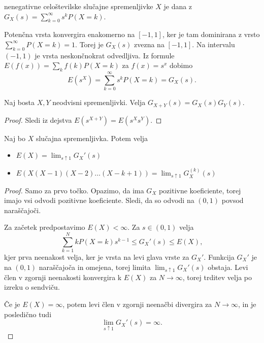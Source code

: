 
\begin{definicija}
   nenegativne celoštevilske slučajne spremenljivke $X$
  je dana z $G_X(s) = \sum_{k=0}^\infty s^k P(X=k)$.
\end{definicija}

Potenčna vrsta konvergira enakomerno na $[-1, 1]$, ker je tam dominirana z vrsto
$\sum_{k=0}^\infty P(X=k) = 1$.
Torej je $G_X(s)$ zvezna na $[-1, 1]$.
Na intervalu $(-1, 1)$ je vrsta neskončnokrat odvedljiva.
Iz formule $E(f(x)) = \sum_k f(k) P(X=k)$ za $f(x) = s^x$ dobimo
\[
  E(s^X) = \sum_{k=0}^\infty s^k P(X=k) = G_X(s).
\]

\begin{izrek}
  Naj bosta $X, Y$ neodvisni spremenljivki.
  Velja $G_{X+Y}(s) = G_X(s) G_Y(s)$.
\end{izrek}

\begin{proof}
  Sledi iz dejstva $E(s^{X+Y}) = E(s^X s^Y)$.
\end{proof}


\begin{izrek}
  Naj bo $X$ slučajna spremenljivka. Potem velja
  \begin{itemize}
  \item $E(X) = \lim_{s \uparrow 1} G_X'(s)$
  \item $E(X (X-1) (X-2) \ldots (X-k+1)) = \lim_{s \uparrow 1} G_X^{(k)}(s)$
  \end{itemize}
\end{izrek}

\begin{proof}
  Samo za prvo točko.
  Opazimo, da ima $G_X$ pozitivne koeficiente, torej imajo vsi odvodi pozitivne
  koeficiente.
  Sledi, da so odvodi na $(0,1)$ povsod naraščajoči.

  Za začetek predpostavimo $E(X) < \infty$.
  Za $s \in (0,1)$ velja
  \[
	\sum_{k=1}^N k P(X = k) s^{k-1} \le G_X'(s) \le E(X),
  \]
  kjer prva neenakost velja, ker je vrsta na levi glava vrste za $G_X'$.
  Funkcija $G_X'$ je na $(0,1)$ naraščajoča in omejena, torej limita $\lim_{s
	\uparrow 1} G_X'(s)$ obstaja.
  Levi člen v zgornji neenakosti konvergira k $E(X)$ za $N \to \infty$, torej
  trditev velja po izreku o sendviču.

  Če je $E(X) = \infty$, potem levi člen v zgornji neenačbi divergira za $N \to
  \infty$, in je posledično tudi
  \[
	\lim_{s \uparrow 1} G_X'(s) = \infty.
  \]
\end{proof}

